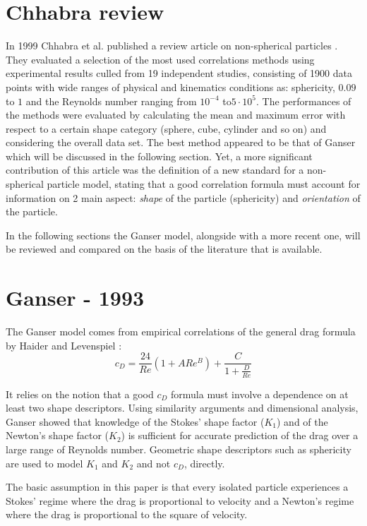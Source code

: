 	\section{Chhabra review}
		In 1999 Chhabra et al. published a review article on non-spherical particles \cite{ChhabraEtAl-1999}. They evaluated a selection of the most used correlations methods using experimental results culled from 19 independent studies, consisting of 1900 data points with wide ranges of physical and kinematics conditions as: sphericity, $ 0.09 $ to $ 1 $ and the Reynolds number ranging from $ 10^{-4} $ to$  5 \cdot 10^{5} $. The performances of the methods were evaluated by calculating the mean and maximum error with respect to a certain shape category (sphere, cube, cylinder and so on) and considering the overall data set. 
		The best method appeared to be that of Ganser \cite{Ganser-1993} which will be discussed in the following section.
		Yet, a more significant contribution of this article was the definition
		of a new standard for a non-spherical particle model, stating that a good correlation formula must account for information on 2 main aspect: \textit{shape} of the particle (sphericity) and \textit{orientation} of the particle. 
		
		In the following sections the Ganser model, alongside with a more recent one, will be reviewed and compared on the basis of the literature that is available. 
		
	\section{Ganser - 1993}
		The Ganser model \cite{Ganser-1993} comes from empirical correlations of the general drag formula by Haider and Levenspiel \cite{HaiderLevenspiel-1989}:
		\begin{equation}
			c_D = \frac{24}{Re} (1 + A Re^B) + \dfrac{C}{1 + \frac{D}{Re}}
		\end{equation}
	
		It relies on the notion that a good $ c_D $ formula must involve a dependence on at least two shape descriptors. Using similarity arguments and dimensional analysis, Ganser showed that knowledge of the Stokes' shape factor ($ K_1 $) and of the Newton's shape factor ($ K_2 $) is sufficient for accurate prediction of the drag over a large range of Reynolds number. 
		Geometric shape descriptors such as sphericity are used	to model $ K_1 $ and $ K_2 $ and not $ c_D $, directly.
		
		The basic assumption in this paper is that every isolated particle experiences a Stokes’ regime where the drag is proportional to velocity and a Newton’s regime where the drag is proportional to the square of velocity. 
		
